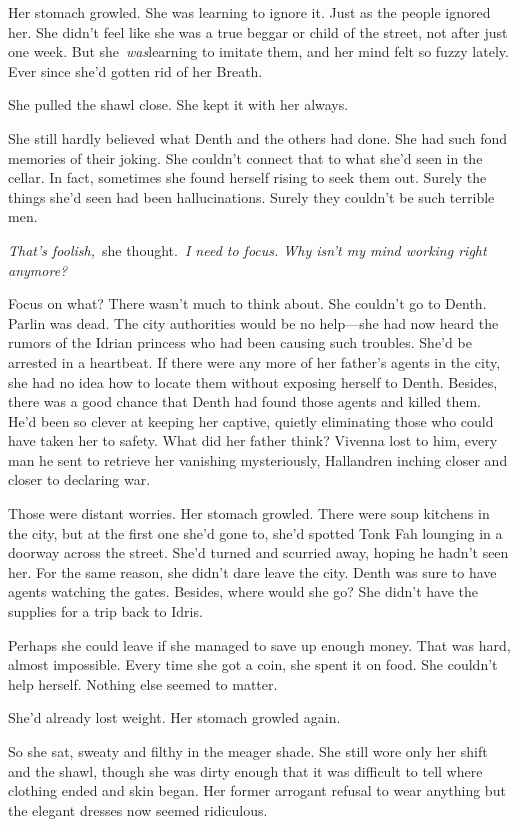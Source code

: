 Her stomach growled. She was learning to ignore it. Just as the people ignored her. She didn’t feel like she was a true beggar or child of the street, not after just one week. But she~\textit{was}learning to imitate them, and her mind felt so fuzzy lately. Ever since she’d gotten rid of her Breath.

She pulled the shawl close. She kept it with her always.

She still hardly believed what Denth and the others had done. She had such fond memories of their joking. She couldn’t connect that to what she’d seen in the cellar. In fact, sometimes she found herself rising to seek them out. Surely the things she’d seen had been hallucinations. Surely they couldn’t be such terrible men.

\textit{That’s foolish,}~she thought.~\textit{I need to focus. Why isn’t my mind working right anymore?}

Focus on what? There wasn’t much to think about. She couldn’t go to Denth. Parlin was dead. The city authorities would be no help—she had now heard the rumors of the Idrian princess who had been causing such troubles. She’d be arrested in a heartbeat. If there were any more of her father’s agents in the city, she had no idea how to locate them without exposing herself to Denth. Besides, there was a good chance that Denth had found those agents and killed them. He’d been so clever at keeping her captive, quietly eliminating those who could have taken her to safety. What did her father think? Vivenna lost to him, every man he sent to retrieve her vanishing mysteriously, Hallandren inching closer and closer to declaring war.

Those were distant worries. Her stomach growled. There were soup kitchens in the city, but at the first one she’d gone to, she’d spotted Tonk Fah lounging in a doorway across the street. She’d turned and scurried away, hoping he hadn’t seen her. For the same reason, she didn’t dare leave the city. Denth was sure to have agents watching the gates. Besides, where would she go? She didn’t have the supplies for a trip back to Idris.

Perhaps she could leave if she managed to save up enough money. That was hard, almost impossible. Every time she got a coin, she spent it on food. She couldn’t help herself. Nothing else seemed to matter.

She’d already lost weight. Her stomach growled again.

So she sat, sweaty and filthy in the meager shade. She still wore only her shift and the shawl, though she was dirty enough that it was difficult to tell where clothing ended and skin began. Her former arrogant refusal to wear anything but the elegant dresses now seemed ridiculous.

